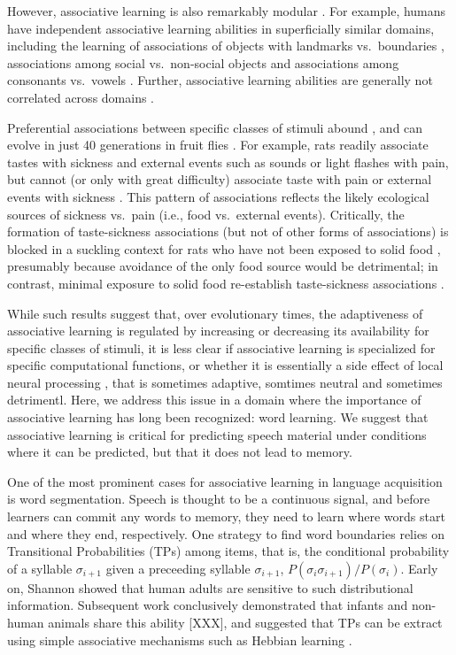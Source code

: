 \documentclass[]{article}
\begin{document}
However, associative learning is also remarkably modular
\citep{Endress-duplications}. For example, humans have independent
associative learning abilities in superficially similar domains,
including the learning of associations of objects with landmarks
vs.~boundaries \citep{Doeller2008, Doeller2008a}, associations among
social vs.~non-social objects \citep{Tompson2019} and associations among
consonants vs.~vowels \citep{Bonatti2005}. Further, associative learning
abilities are generally not correlated across domains
\citep{Siegelman2015}.

Preferential associations between specific classes of stimuli abound
\citep{Seligman1970}, and can evolve in just 40 generations in fruit
flies \citep{Dunlap2014}. For example, rats readily associate tastes
with sickness and external events such as sounds or light flashes with
pain, but cannot (or only with great difficulty) associate taste with
pain or external events with sickness \citep{Garcia1974, Garcia1976}.
This pattern of associations reflects the likely ecological sources of
sickness vs.~pain (i.e., food vs.~external events). Critically, the
formation of taste-sickness associations (but not of other forms of
associations) is blocked in a suckling context for rats who have not
been exposed to solid food \citep{Martin1979, Alberts1984}, presumably
because avoidance of the only food source would be detrimental; in
contrast, minimal exposure to solid food re-establish taste-sickness
associations \citep{Gubernick1984}.

While such results suggest that, over evolutionary times, the
adaptiveness of associative learning is regulated by increasing or
decreasing its availability for specific classes of stimuli, it is less
clear if associative learning is specialized for specific computational
functions, or whether it is essentially a side effect of local neural
processing \citep[a ``spandrel'' in biological terms;][]{Gould1979},
that is sometimes adaptive, somtimes neutral and sometimes detrimentl.
Here, we address this issue in a domain where the importance of
associative learning has long been recognized: word learning. We suggest
that associative learning is critical for predicting speech material
under conditions where it can be predicted, but that it does not lead to
memory.

One of the most prominent cases for associative learning in language
acquisition is word segmentation. Speech is thought to be a continuous
signal, and before learners can commit any words to memory, they need to
learn where words start and where they end, respectively. One strategy
to find word boundaries relies on Transitional Probabilities (TPs) among
items, that is, the conditional probability of a syllable
\(\sigma_{i+1}\) given a preceeding syllable \(\sigma_{i+1}\),
\(P(\sigma_{i}\sigma_{i+1})/P(\sigma_{i})\). Early on, Shannon
\citep{Shannon1951} showed that human adults are sensitive to such
distributional information. Subsequent work conclusively demonstrated
that infants and non-human animals share this ability {[}XXX{]}, and
suggested that TPs can be extract using simple associative mechanisms
such as Hebbian learning \citep{Endress-TP-Model}.
\end{document}
